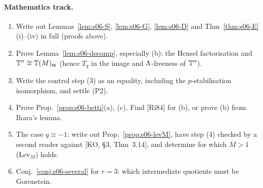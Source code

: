 \paragraph{Mathematics track.}
\begin{enumerate}[label=M\arabic*.]
\item Write out Lemmas~\ref{lem:s06-S}, \ref{lem:s06-G}, \ref{lem:s06-D} and Thm~\ref{thm:s06-E}(i)--(iv) in full (proofs above).
\item Prove Lemma~\ref{lem:s06-decomp}, especially (b): the Hensel factorisation and $\mathbb{T}''\cong\mathbb{T}(M)_{\mathfrak{m}}$ (hence $T_q$ in the image and
  $\Lambda$-freeness of $\mathbb{T}''$). 
\item Write the control step (3) as an equality, including the $p$-stabilisation isomorphism, and settle (P2).
\item Prove Prop.~\ref{prop:s06-betti}(a), (c). Find [Ri84] for (b), or prove (b) from Ihara's lemma.
\item The case $q\equiv-1$: write out Prop.~\ref{prop:s06-levM}, have step (4) checked by a second reader against [KO, \S3,
  Thm~3.14], and determine for which $M>1$ (Lev$_M$) holds. 
\item Conj.~\ref{conj:s06-several} for $r=3$: which intermediate quotients must be Gorenstein.
\end{enumerate}

